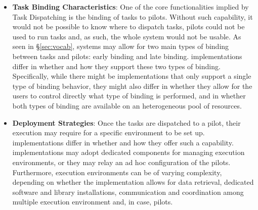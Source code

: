 \documentclass{sig-alternate}
\begin{document}
\begin{itemize}
\item \textbf{Task Binding Characteristics}: One of the core
  functionalities implied by Task Dispatching is the binding of tasks
  to pilots. Without such capability, it would not be possible to know
  where to dispatch tasks, pilots could not be used to run tasks and,
  as such, the whole \pilotjob system would not be usable. As seen in
  \S\ref{sec:vocab}, \pilotjob systems may allow for two main types of
  binding between tasks and pilots: early binding and late
  binding. \pilotjob implementations differ in whether and how they
  support these two types of binding. Specifically, while there might
  be implementations that only support a single type of binding
  behavior, they might also differ in whether they allow for the users
  to control directly what type of binding is performed, and in
  whether both types of binding are available on an heterogeneous pool
  of resources.

\item \textbf{Deployment Strategies}: Once the tasks are dispatched to
  a pilot, their execution may require for a specific environment to
  be set up.  \pilotjob implementations differ in whether and how they
  offer such a capability. \pilotjob implementations may adopt
  dedicated components for managing execution environments, or they
  may relay an ad hoc configuration of the pilots. Furthermore,
  execution environments can be of varying complexity, depending on
  whether the \pilotjob implementation allows for data retrieval,
  dedicated software and library installations, communication and
  coordination among multiple execution environment and, in case,
  pilots.

\end{itemize}

\end{document}
